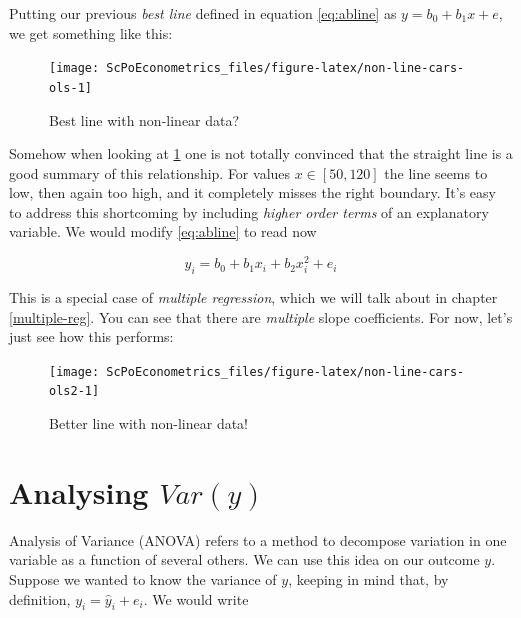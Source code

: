 \documentclass[]{book}
\begin{document}
Putting our previous \emph{best line} defined in equation \eqref{eq:abline} as \(y = b_0 + b_1 x + e\), we get something like this:

\begin{figure}

{\centering \texttt{[image: ScPoEconometrics\_files/figure-latex/non-line-cars-ols-1]} 

}

\caption{Best line with non-linear data?}\label{fig:non-line-cars-ols}
\end{figure}

Somehow when looking at \ref{fig:non-line-cars-ols} one is not totally convinced that the straight line is a good summary of this relationship. For values \(x\in[50,120]\) the line seems to low, then again too high, and it completely misses the right boundary. It's easy to address this shortcoming by including \emph{higher order terms} of an explanatory variable. We would modify \eqref{eq:abline} to read now

\begin{equation}
y_i = b_0 + b_1 x_i + b_2 x_i^2 + e_i \label{eq:abline2}
\end{equation}

This is a special case of \emph{multiple regression}, which we will talk about in chapter \ref{multiple-reg}. You can see that there are \emph{multiple} slope coefficients. For now, let's just see how this performs:

\begin{figure}

{\centering \texttt{[image: ScPoEconometrics\_files/figure-latex/non-line-cars-ols2-1]} 

}

\caption{Better line with non-linear data!}\label{fig:non-line-cars-ols2}
\end{figure}

\hypertarget{analysing-vary}{%
\section{\texorpdfstring{Analysing \(Var(y)\)}{Analysing Var(y)}}\label{analysing-vary}}

Analysis of Variance (ANOVA) refers to a method to decompose variation in one variable as a function of several others. We can use this idea on our outcome \(y\). Suppose we wanted to know the variance of \(y\), keeping in mind that, by definition, \(y_i = \hat{y}_i + e_i\). We would write
\end{document}
